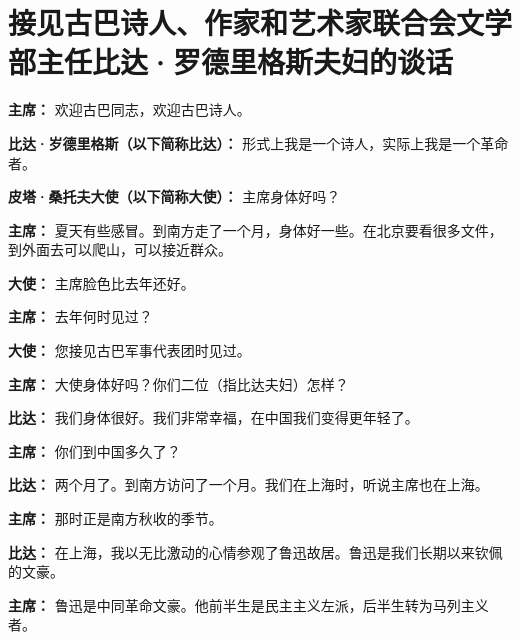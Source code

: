 \section[接见古巴诗人、作家和艺术家联合会文学部主任比达·罗德里格斯夫妇的谈话（一九六三年十一月二十六日）]{接见古巴诗人、作家和艺术家联合会文学部主任比达·罗德里格斯夫妇的谈话}

\begin{duihua}
    
\item[\textbf{主席：}] 欢迎古巴同志，欢迎古巴诗人。

\item[\textbf{比达·岁德里格斯（以下简称比达）：}] 形式上我是一个诗人，实际上我是一个革命者。

\item[\textbf{皮塔·桑托夫大使（以下简称大使）：}] 主席身体好吗？

\item[\textbf{主席：}] 夏天有些感冒。到南方走了一个月，身体好一些。在北京要看很多文件，到外面去可以爬山，可以接近群众。

\item[\textbf{大使：}] 主席脸色比去年还好。

\item[\textbf{主席：}] 去年何时见过？

\item[\textbf{大使：}] 您接见古巴军事代表团时见过。

\item[\textbf{主席：}] 大使身体好吗？你们二位（指比达夫妇）怎样？

\item[\textbf{比达：}] 我们身体很好。我们非常幸福，在中国我们变得更年轻了。

\item[\textbf{主席：}] 你们到中国多久了？

\item[\textbf{比达：}] 两个月了。到南方访问了一个月。我们在上海时，听说主席也在上海。

\item[\textbf{主席：}] 那时正是南方秋收的季节。

\item[\textbf{比达：}] 在上海，我以无比激动的心情参观了鲁迅故居。鲁迅是我们长期以来钦佩的文豪。

\item[\textbf{主席：}] 鲁迅是中同革命文豪。他前半生是民主主义左派，后半生转为马列主义者。


\end{duihua}
